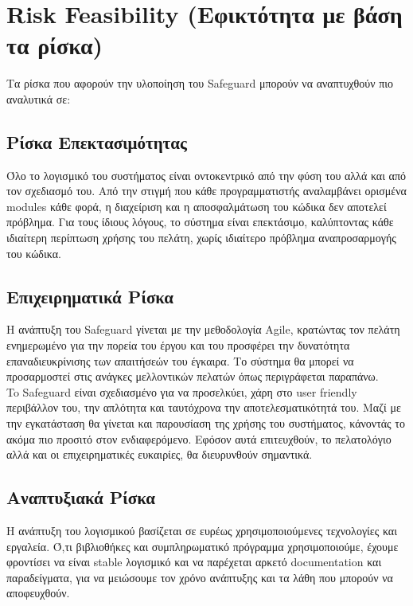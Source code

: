 \documentclass{article}
\begin{document}
\section{Risk Feasibility (Εφικτότητα με βάση τα ρίσκα)}
Τα ρίσκα που αφορούν την υλοποίηση του Safeguard μπορούν να αναπτυχθούν πιο αναλυτικά σε:
\subsection{Ρίσκα Επεκτασιμότητας}
Όλο το λογισμικό του συστήματος είναι οντοκεντρικό από την φύση του αλλά και από τον σχεδιασμό του. Aπό την στιγμή που κάθε προγραμματιστής αναλαμβάνει ορισμένα modules κάθε φορά, η διαχείριση και η αποσφαλμάτωση του κώδικα δεν αποτελεί πρόβλημα. Για τους ίδιους λόγους, το σύστημα είναι επεκτάσιμο, καλύπτοντας κάθε ιδιαίτερη περίπτωση χρήσης του πελάτη, χωρίς ιδιαίτερο πρόβλημα αναπροσαρμογής του κώδικα.
\subsection{Επιχειρηματικά Ρίσκα}
Η ανάπτυξη του Safeguard γίνεται με την μεθοδολογία Agile, κρατώντας τον πελάτη ενημερωμένο για την πορεία του έργου και του προσφέρει την δυνατότητα επαναδιευκρίνισης των απαιτήσεών του έγκαιρα. Το σύστημα θα μπορεί να προσαρμοστεί στις ανάγκες μελλοντικών πελατών όπως περιγράφεται παραπάνω. \\
	To Safeguard είναι σχεδιασμένο για να προσελκύει, χάρη στο user friendly περιβάλλον του, την απλότητα και ταυτόχρονα την αποτελεσματικότητά του. Μαζί με την εγκατάσταση θα γίνεται και παρουσίαση της χρήσης του συστήματος, κάνοντάς το ακόμα πιο προσιτό στον ενδιαφερόμενο. Εφόσον αυτά επιτευχθούν, το πελατολόγιο αλλά και οι επιχειρηματικές ευκαιρίες, θα διευρυνθούν σημαντικά.
\subsection{Αναπτυξιακά Ρίσκα}
Η ανάπτυξη του λογισμικού βασίζεται σε ευρέως χρησιμοποιούμενες τεχνολογίες και εργαλεία. Ό,τι βιβλιοθήκες και συμπληρωματικό πρόγραμμα χρησιμοποιούμε, έχουμε φροντίσει να είναι stable λογισμικό και να παρέχεται αρκετό documentation και παραδείγματα, για να μειώσουμε τον χρόνο ανάπτυξης και τα λάθη που μπορούν να αποφευχθούν.
\end{document}
